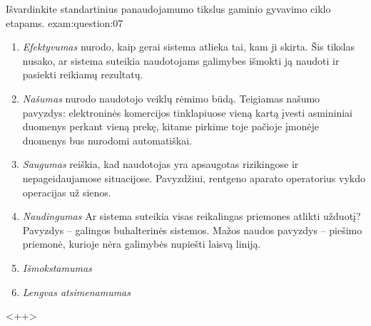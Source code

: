 \begin{question}{%
  Išvardinkite standartinius panaudojamumo tikslus gaminio gyvavimo ciklo
  etapams.
  }{exam:question:07}
  \begin{enumerate}
    \item \emph{Efektyvumas} nurodo, kaip gerai sistema  atlieka tai,
      kam ji skirta. Šis tikslas nusako, ar sistema suteikia
      naudotojams galimybes išmokti ją  naudoti ir pasiekti reikiamų
      rezultatų.
    \item \emph{Našumas} nurodo naudotojo veiklų rėmimo būdą.
      Teigiamas našumo pavyzdys: elektroninės komercijos tinklapiuose
      vieną kartą įvesti asmininiai duomenys perkant vieną prekę,
      kitame pirkime toje pačioje įmonėje duomenys bus nurodomi
      automatiškai.
    \item \emph{Saugumas} reiškia, kad naudotojas yra apsaugotas
      rizikingose ir nepageidaujamose situacijose. Pavyzdžiui, rentgeno
      aparato operatorius vykdo operacijas už sienos.
    \item \emph{Naudingumas} Ar sistema suteikia visas reikalingas
      priemones atlikti užduotį? Pavyzdys – galingos buhalterinės
      sistemos. Mažos naudos pavyzdys – piešimo priemonė, kurioje
      nėra galimybės nupiešti laisvą liniją.
    \item \emph{Išmokstamumas}
    \item \emph{Lengvas atsimenamumas}
  \end{enumerate}
  <++>
\end{question}

